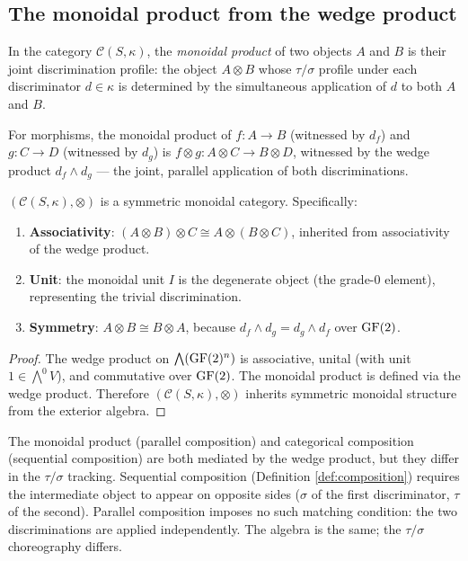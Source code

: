
\subsection{The monoidal product from the wedge product}

\begin{definition}\label{def:monoidal-prod}
In the category $\mathcal{C}(S,\kappa)$, the
\emph{monoidal product} of two objects $A$ and $B$ is their
joint discrimination profile: the object $A \otimes B$ whose
$\tau/\sigma$ profile under each discriminator $d \in \kappa$
is determined by the simultaneous application of $d$ to both
$A$ and $B$.

For morphisms, the monoidal product of $f: A \to B$
(witnessed by $d_f$) and $g: C \to D$ (witnessed by $d_g$)
is $f \otimes g: A \otimes C \to B \otimes D$, witnessed by
the wedge product $d_f \wedge d_g$ --- the joint, parallel
application of both discriminations.
\end{definition}

\begin{proposition}
\label{prop:sym-monoidal}
$(\mathcal{C}(S,\kappa), \otimes)$ is a symmetric monoidal
category. Specifically:
\begin{enumerate}[label=(\roman*),nosep]
  \item \textbf{Associativity}: $(A \otimes B) \otimes C
    \cong A \otimes (B \otimes C)$, inherited from
    associativity of the wedge product.
  \item \textbf{Unit}: the monoidal unit $I$ is the
    degenerate object (the grade-0 element), representing
    the trivial discrimination.
  \item \textbf{Symmetry}: $A \otimes B \cong B \otimes A$,
    because $d_f \wedge d_g = d_g \wedge d_f$ over $\operatorname{GF}(2)$.
\end{enumerate}
\end{proposition}

\begin{proof}
The wedge product on $\bigwedge(\operatorname{GF}(2)^n)$ is associative,
unital (with unit $1 \in \bigwedge^0 V$), and commutative
over $\operatorname{GF}(2)$. The monoidal product is defined via the
wedge product. Therefore $(\mathcal{C}(S,\kappa), \otimes)$
inherits symmetric monoidal structure from the exterior
algebra.
\end{proof}

\begin{remark}
The monoidal product (parallel composition) and categorical
composition (sequential composition) are both mediated by
the wedge product, but they differ in the $\tau/\sigma$
tracking. Sequential composition
(Definition \ref{def:composition}) requires the intermediate
object to appear on opposite sides ($\sigma$ of the first
discriminator, $\tau$ of the second). Parallel composition
imposes no such matching condition: the two discriminations
are applied independently. The algebra is the same; the
$\tau/\sigma$ choreography differs.
\end{remark}

